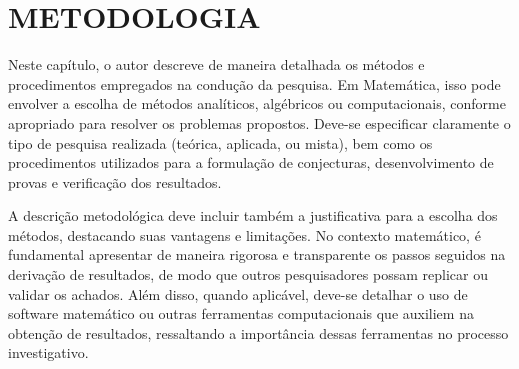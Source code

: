 
\chapter{METODOLOGIA}

Neste capítulo, o autor descreve de maneira detalhada os métodos e procedimentos empregados na condução da pesquisa. Em Matemática, isso pode envolver a escolha de métodos analíticos, algébricos ou computacionais, conforme apropriado para resolver os problemas propostos. Deve-se especificar claramente o tipo de pesquisa realizada (teórica, aplicada, ou mista), bem como os procedimentos utilizados para a formulação de conjecturas, desenvolvimento de provas e verificação dos resultados.

A descrição metodológica deve incluir também a justificativa para a escolha dos métodos, destacando suas vantagens e limitações. No contexto matemático, é fundamental apresentar de maneira rigorosa e transparente os passos seguidos na derivação de resultados, de modo que outros pesquisadores possam replicar ou validar os achados. Além disso, quando aplicável, deve-se detalhar o uso de software matemático ou outras ferramentas computacionais que auxiliem na obtenção de resultados, ressaltando a importância dessas ferramentas no processo investigativo.